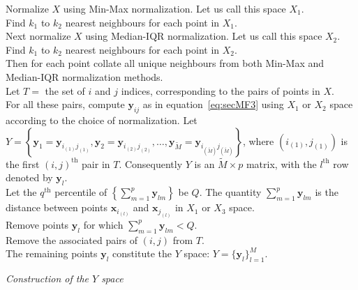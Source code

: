 \documentclass[11pt]{article}
\begin{document}
\DontPrintSemicolon
\begin{algorithm}\fontsize{9}{10}\selectfont
	Normalize $X$ using Min-Max normalization. Let us call this space $X_1$.  \\
	Find $k_1$ to $k_2$ nearest neighbours for each point in  $X_1$. \\
	Next normalize $X$ using Median-IQR normalization. Let us call this space $X_2$.  \\
	Find $k_1$ to $k_2$ nearest neighbours for each point in  $X_2$. \\
	Then for each point collate all unique neighbours from both Min-Max and Median-IQR normalization methods.   \\
	Let $T = $ the set of $i$ and $j$ indices, corresponding to the pairs of points in $X$. \\
	For all these pairs, compute $\bm{y}_{ij}$ as in equation~\eqref{eq:secMF3} using $X_1$ or $X_2$ space according to the choice of normalization. Let $Y =\left\{ \bm{y}_{1} =\bm{y}_{i_{(1)}j_{(1)}} , \bm{y}_{2} =\bm{y}_{i_{(2)}j_{(2)}}, \ldots, \bm{y}_{\tilde{M}} =\bm{y}_{i_{(\tilde{M})}j_{(\tilde{M})}} \right\}$, where $\left( i_{(1)},j_{(1)} \right)$ is the first $(i, j)^{\text{th}}$ pair in $T$. Consequently $Y$ is an $\tilde{M}\times p$ matrix, with the $l^{\text{th}}$ row denoted by $\bm{y}_l$.\\
	Let the $q^{\text{th}}$ percentile of $ \left\{\sum_{m=1}^p \bm{y}_{lm}\right\}$ be $Q$. The quantity $\sum_{m=1}^p \bm{y}_{lm}$ is the distance between points $\bm{x}_{i_{(l)}}$ and $\bm{x}_{j_{(l)}}$ in  $X_1$ or $X_3$  space. \\
	Remove points $\bm{y}_l$ for which  $  \sum_{m=1}^p \bm{y}_{lm}  < Q $. \\
	Remove the associated pairs of $(i, j)$ from $T$. \\
	The remaining points $\bm{y}_l$ constitute the $Y$ space: $Y = \{\bm{y}_l \}_{l=1}^M$.
	\caption{\itshape Construction of the $Y$ space}
	\label{algo:YSpace}
\end{algorithm}
\end{document}
